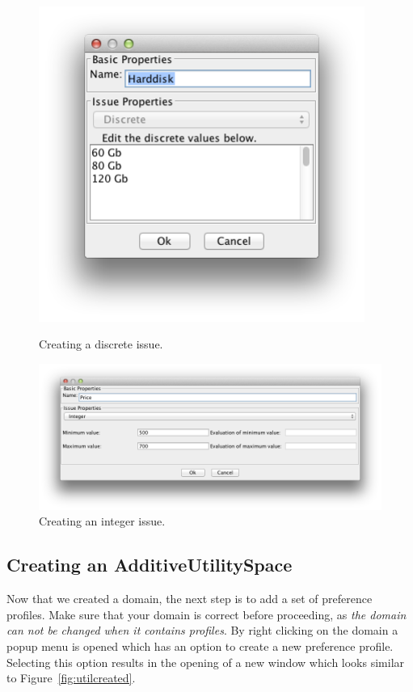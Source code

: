 \documentclass[]{article}
\begin{document}
\begin{figure}[ht]
\center
\begin{minipage}[b]{0.35\linewidth}
	\includegraphics[width=0.95\textwidth]{media/image7a.png}
\caption{Creating a discrete issue.}
\label{fig:createIssueD}
\end{minipage}
\begin{minipage}[b]{0.55\linewidth}
	\includegraphics[width=1.0\textwidth]{media/image7b.png}
\caption{Creating an integer issue.}\label{fig:createIssueI}
\end{minipage}
\end{figure}

\FloatBarrier

\subsection{Creating an AdditiveUtilitySpace}\label{sec:createAdditive} 
Now that we created a domain, the next step is to add a set of preference profiles. Make sure that your domain is correct before proceeding, as \textit{the domain can not be changed when it contains profiles}. By right clicking on the domain a popup menu is opened which has an option to create a new preference profile. Selecting this option results in the opening of a new window which looks similar to Figure~\ref{fig:utilcreated}.
\end{document}
